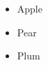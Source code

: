 \documentclass{article}
\begin{document}
\begin{itemize}
\item Apple
\item Pear
\item Plum
\end{itemize}
\end{document}
